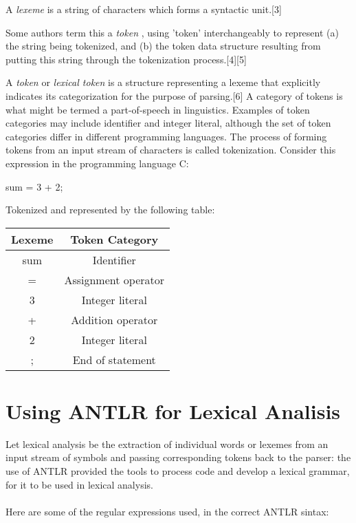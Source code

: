 \documentclass[twocolumn,10ptr]{article}
\begin{document}
	A  \textit{lexeme}  is a string of characters which forms a syntactic unit.[3]
	
	Some authors term this a  \textit{token} , using 'token' interchangeably to represent (a) the string being tokenized, and (b) the token data structure resulting from putting this string through the tokenization process.[4][5]
	
	A \textit{token}  or \textit{lexical token}  is a structure representing a lexeme that explicitly indicates its categorization for the purpose of parsing.[6] A category of tokens is what might be termed a part-of-speech in linguistics. Examples of token categories may include identifier and integer literal, although the set of token categories differ in different programming languages. The process of forming tokens from an input stream of characters is called tokenization. Consider this expression in the programming language C:
	
	sum = 3 + 2;
	
	Tokenized and represented by the following table:
	
	
	\begin{center}
		\begin{tabular}{||c c||} 
			\hline
			Lexeme & Token Category\\ [0.5ex] 
			\hline\hline
			sum	&	Identifier  \\ 
			\hline
			=	&	Assignment operator  \\ 
			\hline
			3	&	Integer literal  \\ 
			\hline
			+	&	Addition operator  \\ 
			\hline
			2	&	Integer literal  \\ 
			\hline
			;	&	End of statement  \\ [1ex] 
			\hline
		\end{tabular}
	\end{center}
	
	
	
	\section{Using ANTLR for Lexical Analisis}
	Let lexical analysis be the extraction of individual words or lexemes from an input stream of symbols and passing corresponding tokens back to the parser: the use of ANTLR provided the tools to process code and develop a lexical grammar, for it to be used in lexical analysis.\\\\
	Here are some of the regular expressions used, in the correct ANTLR sintax:\\
	
\end{document}
